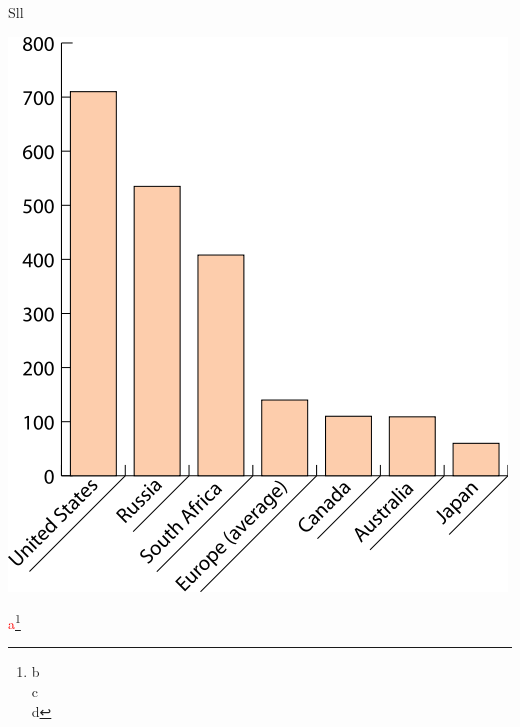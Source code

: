 \documentclass[print,Draft]{faosyb}
\begin{document}
\begin{chart}{S}{ll}
\caption{Incarceration ratest acroos countries: First ll chart}
\label{chart:incarceration}
\includegraphics[width=\chartwidth,height=\chartheight]{incarceration}  
\end{chart}
\textcolor{red}{a}\footnote{b\\c\\d}
\lipsum[5-12]
\clearspread
\end{document}
